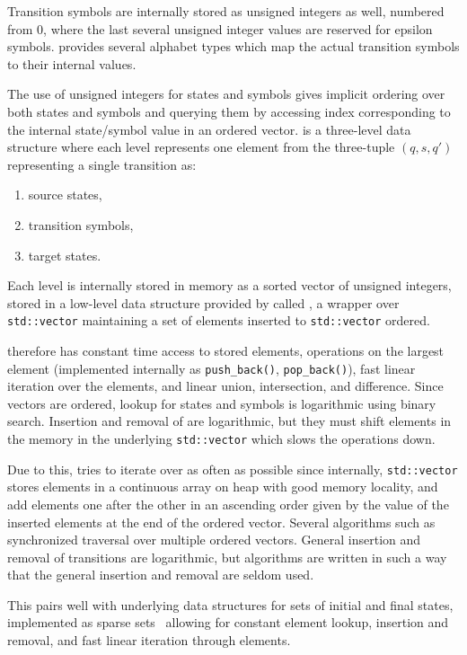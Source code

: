 Transition symbols are internally stored as unsigned integers as well, numbered from 0, where the last several unsigned integer values are reserved for epsilon symbols.
\mata provides several alphabet types which map the actual transition symbols to their internal values.

The use of unsigned integers for states and symbols gives implicit ordering over both states and symbols and querying them by accessing index corresponding to the internal state/symbol value in an ordered vector.
\deltastruct is a three-level data structure where each level represents one element from the three-tuple $(q, s, q')$ representing a single transition as:
\begin{enumerate}
    \item source states,
    \item transition symbols,
    \item target states.
\end{enumerate}

Each level is internally stored in memory as a sorted vector of unsigned integers, stored in a low-level data structure provided by \mata called \ordvector, a wrapper over \texttt{std::vector} maintaining a set of elements inserted to \texttt{std::vector} ordered.

\ordvector therefore has constant time access to stored elements, operations on the largest element (implemented internally as \texttt{push\_back()}, \texttt{pop\_back()}), fast linear iteration over the elements, and linear union, intersection, and difference.
Since vectors are ordered, lookup for states and symbols is logarithmic using binary search.
Insertion and removal of are logarithmic, but they must shift elements in the memory in the underlying \texttt{std::vector} which slows the operations down.

Due to this, \mata tries to iterate over \ordvector as often as possible since internally, \texttt{std::vector} stores elements in a continuous array on heap with good memory locality, and add elements one after the other in an ascending order given by the value of the inserted elements at the end of the ordered vector.
Several algorithms such as synchronized traversal over multiple ordered vectors.
General insertion and removal of transitions are logarithmic, but \mata algorithms are written in such a way that the general insertion and removal are seldom used.

This pairs well with underlying data structures for sets of initial and final states, implemented as sparse sets~\cite{sparseset93} allowing for constant element lookup, insertion and removal, and fast linear iteration through elements.

